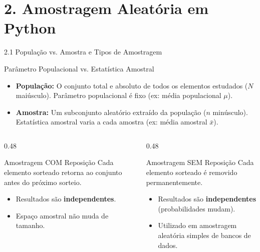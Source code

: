 \documentclass[10pt, aspectratio=169]{beamer}
\begin{document}
\section{2. Amostragem Aleatória em Python}

\begin{frame}{2.1 População vs. Amostra e Tipos de Amostragem}
    \begin{block}{Parâmetro Populacional vs. Estatística Amostral}
        \begin{itemize}
            \item \textbf{População:} O conjunto total e absoluto de todos os elementos estudados ($N$ maiúsculo). Parâmetro populacional é fixo (ex: média populacional $\mu$).
            \item \textbf{Amostra:} Um subconjunto aleatório extraído da população ($n$ minúsculo). Estatística amostral varia a cada amostra (ex: média amostral $\bar{x}$).
        \end{itemize}
    \end{block}

    \vspace{0.2cm}

    \begin{columns}[T]
        \begin{column}{0.48\textwidth}
            \begin{exampleblock}{Amostragem COM Reposição}
                Cada elemento sorteado retorna ao conjunto antes do próximo sorteio.
                \begin{itemize}
                    \item Resultados são \textbf{independentes}.
                    \item Espaço amostral não muda de tamanho.
                \end{itemize}
            \end{exampleblock}
        \end{column}

        \begin{column}{0.48\textwidth}
            \begin{block}{Amostragem SEM Reposição}
                Cada elemento sorteado é removido permanentemente.
                \begin{itemize}
                    \item Resultados são \textbf{independentes} (probabilidades mudam).
                    \item Utilizado em amostragem aleatória simples de bancos de dados.
                \end{itemize}
            \end{block}
        \end{column}
    \end{columns}
\end{frame}
\end{document}
